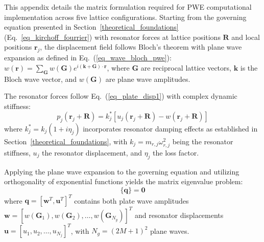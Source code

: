 \documentclass[review,numbers,sort&compress]{elsarticle}
\begin{document}
This appendix details the matrix formulation required for PWE computational implementation across five lattice configurations. Starting from the governing equation presented in Section~\ref{theoretical_foundations} (Eq.~\ref{eq_kirchoff_fourrier}) with resonator forces at lattice positions $\mathbf{R}$ and local positions $\mathbf{r}_j$, the displacement field follows Bloch's theorem with plane wave expansion as defined in Eq.~(\ref{eq_wave_bloch_pwe}): $w(\mathbf{r}) = \sum_{\mathbf{G}} w(\mathbf{G}) e^{i(\mathbf{k}+\mathbf{G}) \cdot \mathbf{r}}$, where $\mathbf{G}$ are reciprocal lattice vectors, $\mathbf{k}$ is the Bloch wave vector, and $w(\mathbf{G})$ are plane wave amplitudes.

The resonator forces follow Eq.~(\ref{eq_plate_disp1}) with complex dynamic stiffness:
\begin{equation}
p_j(\mathbf{r}_j + \mathbf{R}) = k_j^*[u_j(\mathbf{r}_j + \mathbf{R}) - w(\mathbf{r}_j + \mathbf{R})]
\label{eq:resonator_force_app}
\end{equation}
where $k_j^* = k_j(1 + i\eta_j)$ incorporates resonator damping effects as established in Section~\ref{theoretical_foundations}, with $k_j = m_{r,j}\omega_{r,j}^2$ being the resonator stiffness, $u_j$ the resonator displacement, and $\eta_j$ the loss factor.

Applying the plane wave expansion to the governing equation and utilizing orthogonality of exponential functions yields the matrix eigenvalue problem:
\begin{equation}
[\mathbf{K}-\omega^{2}\mathbf{M}]\bigl\{ \mathbf{q} \bigr\} = \mathbf{0}
\label{eq:pwe_eigenvalue_app}
\end{equation}
where $\mathbf{q} = [\mathbf{w}^T, \mathbf{u}^T]^T$ contains both plate wave amplitudes $\mathbf{w} = [w(\mathbf{G}_1), w(\mathbf{G}_2), \ldots, w(\mathbf{G}_{N_g})]^T$ and resonator displacements $\mathbf{u} = [u_1, u_2, \ldots, u_{N_j}]^T$, with $N_g = (2M+1)^2$ plane waves.
\end{document}
